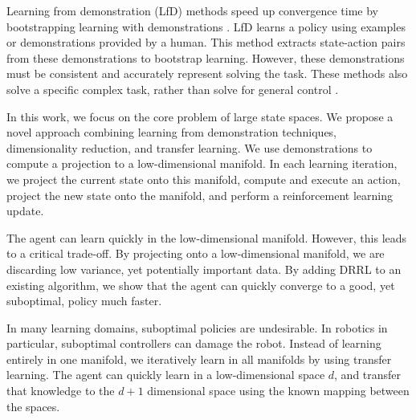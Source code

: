 \documentclass[10pt,a4paper]{article}
\begin{document}
Learning from demonstration (LfD) methods speed up convergence time by bootstrapping learning with demonstrations \cite{Argall:2009:SRL:1523530.1524008}. LfD learns a policy using examples or demonstrations provided by a human. This method extracts state-action pairs from these demonstrations to bootstrap learning.  However, these demonstrations must be consistent and accurately represent solving the task. These methods also solve a specific complex task, rather than solve for general control \cite{Argall:2009:SRL:1523530.1524008}.

In this work, we focus on the core problem of large state spaces. We propose a novel approach combining learning from demonstration techniques, dimensionality reduction, and transfer learning. We use demonstrations to compute a projection to a low-dimensional manifold.  In each learning iteration, we project the current state onto this manifold, compute and execute an action, project the new state onto the manifold, and perform a reinforcement learning update.



The agent can learn quickly in the low-dimensional manifold. However, this leads to a critical trade-off. By projecting onto a low-dimensional manifold, we are discarding low variance, yet potentially important data. By adding DRRL to an existing algorithm, we show that the agent can quickly converge to a good, yet suboptimal, policy much faster. 

In many learning domains, suboptimal policies are undesirable. In robotics in particular, suboptimal controllers can damage the robot. Instead of learning entirely in one manifold, we iteratively learn in all manifolds by using transfer learning. The agent can quickly learn in a low-dimensional space $d$, and transfer that knowledge to the $d+1$ dimensional space using the known mapping between the spaces.
\end{document}

